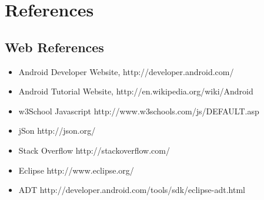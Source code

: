 \documentclass[12pt]{report}
\begin{document}
\chapter{References}

\section{Web References}

\begin{itemize}
\item Android Developer Website, http://developer.android.com/
\item Android Tutorial Website, http://en.wikipedia.org/wiki/Android
\item w3School Javascript http://www.w3schools.com/js/DEFAULT.asp
\item jSon http://json.org/
\item Stack Overflow http://stackoverflow.com/
\item Eclipse http://www.eclipse.org/
\item ADT http://developer.android.com/tools/sdk/eclipse-adt.html

\end{itemize}



\end{document}
